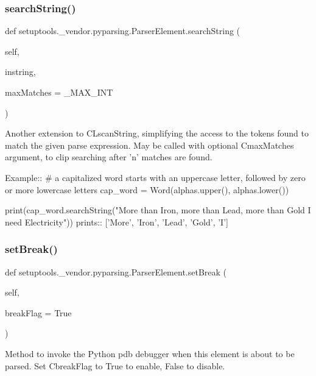 \subsubsection{\texorpdfstring{search\+String()}{searchString()}}
{\footnotesize\ttfamily def setuptools.\+\_\+vendor.\+pyparsing.\+Parser\+Element.\+search\+String (\begin{DoxyParamCaption}\item[{}]{self,  }\item[{}]{instring,  }\item[{}]{max\+Matches = {\ttfamily \+\_\+MAX\+\_\+INT} }\end{DoxyParamCaption})}

\begin{DoxyVerb}Another extension to C{L{scanString}}, simplifying the access to the tokens found
to match the given parse expression.  May be called with optional
C{maxMatches} argument, to clip searching after 'n' matches are found.

Example::
    # a capitalized word starts with an uppercase letter, followed by zero or more lowercase letters
    cap_word = Word(alphas.upper(), alphas.lower())
    
    print(cap_word.searchString("More than Iron, more than Lead, more than Gold I need Electricity"))
prints::
    ['More', 'Iron', 'Lead', 'Gold', 'I']
\end{DoxyVerb}
 \mbox{\label{classsetuptools_1_1__vendor_1_1pyparsing_1_1_parser_element_a1f7a4070fece9d0194863d4dc41cd830}} 
\subsubsection{\texorpdfstring{set\+Break()}{setBreak()}}
{\footnotesize\ttfamily def setuptools.\+\_\+vendor.\+pyparsing.\+Parser\+Element.\+set\+Break (\begin{DoxyParamCaption}\item[{}]{self,  }\item[{}]{break\+Flag = {\ttfamily True} }\end{DoxyParamCaption})}

\begin{DoxyVerb}Method to invoke the Python pdb debugger when this element is
   about to be parsed. Set C{breakFlag} to True to enable, False to
   disable.
\end{DoxyVerb}
 \mbox{\label{classsetuptools_1_1__vendor_1_1pyparsing_1_1_parser_element_ae589616c030e7bc76f86c139b60e2bc6}} 
